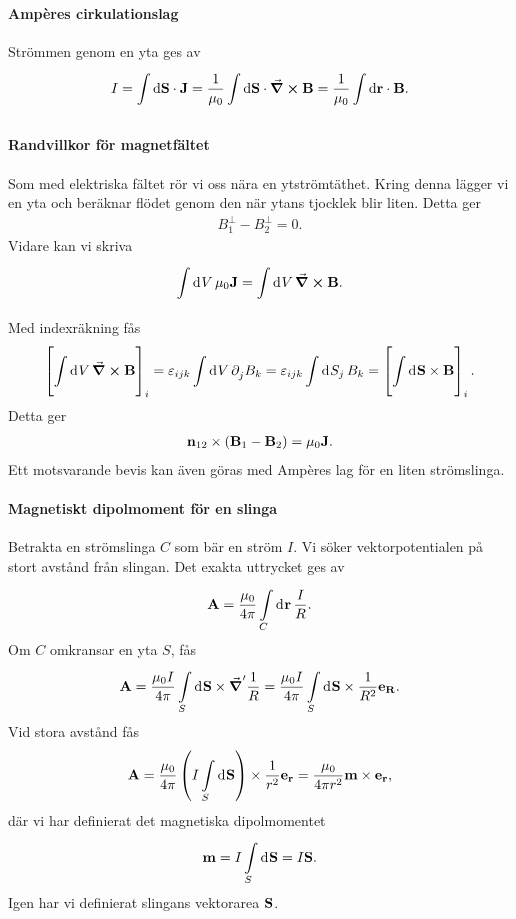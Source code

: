 \paragraph{Ampères cirkulationslag}
Strömmen genom en yta ges av
\begin{align*}
	I = \int\limits_{}^{}\dd{\vb{S}}\cdot \vb{J} = \frac{1}{\mu_{0}}\int\limits_{}^{}\dd{\vb{S}}\cdot \curl{\vb{B}} = \frac{1}{\mu_{0}}\int\limits_{}^{}\dd{\vb{r}}\cdot \vb{B}.
\end{align*}

\paragraph{Randvillkor för magnetfältet}
Som med elektriska fältet rör vi oss nära en ytströmtäthet. Kring denna lägger vi en yta och beräknar flödet genom den när ytans tjocklek blir liten. Detta ger
\begin{align*}
	B_{1}^{\perp} - B_{2}^{\perp} = 0.
\end{align*}
Vidare kan vi skriva
\begin{align*}
	\int\limits_{}^{}\dd[]{V}\mu_{0}\vb{J} = \int\limits_{}^{}\dd[]{V}\curl{\vb{B}}.
\end{align*}
Med indexräkning fås
\begin{align*}
	\left[\int\limits_{}^{}\dd[]{V}\curl{\vb{B}}\right]_{i} = \varepsilon_{ijk}\int\limits_{}^{}\dd[]{V}\partial_{j}^{}B_{k} = \varepsilon_{ijk}\int\limits_{}^{}\dd[]{S_{j}}B_{k} = \left[\int\limits_{}^{}\dd[]{\vb{S}}\times\vb{B}\right]_{i}.
\end{align*}
Detta ger
\begin{align*}
	\vb{n}_{12}\times(\vb{B}_{1} - \vb{B}_{2}) = \mu_{0}\vb{J}.
\end{align*}
Ett motsvarande bevis kan även göras med Ampères lag för en liten strömslinga.

\paragraph{Magnetiskt dipolmoment för en slinga}
Betrakta en strömslinga $C$ som bär en ström $I$. Vi söker vektorpotentialen på stort avstånd från slingan. Det exakta uttrycket ges av
\begin{align*}
	\vb{A} = \frac{\mu_{0}}{4\pi}\int\limits_{C}^{}\dd[]{\vb{r}}\frac{I}{R}.
\end{align*}
Om $C$ omkransar en yta $S$, fås
\begin{align*}
	\vb{A} = \frac{\mu_{0}I}{4\pi}\int\limits_{S}^{}\dd[]{\vb{S}}\times\grad'{\frac{1}{R}} = \frac{\mu_{0}I}{4\pi}\int\limits_{S}^{}\dd[]{\vb{S}}\times\frac{1}{R^{2}}\vb{e}_{\vb{R}}.
\end{align*}
Vid stora avstånd fås
\begin{align*}
	\vb{A} = \frac{\mu_{0}}{4\pi}\left(I\int\limits_{S}^{}\dd[]{\vb{S}}\right)\times\frac{1}{r^{2}}\vb{e}_{\vb{r}} = \frac{\mu_{0}}{4\pi r^{2}}\vb{m}\times\vb{e}_{\vb{r}},
\end{align*}
där vi har definierat det magnetiska dipolmomentet
\begin{align*}
	\vb{m} = I\int\limits_{S}^{}\dd[]{\vb{S}} = I\vb{S}.
\end{align*}
Igen har vi definierat slingans vektorarea $\vb{S}$.

